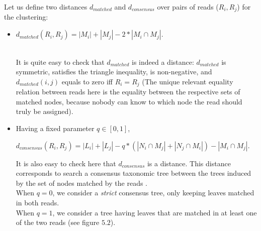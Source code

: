 \documentclass{report}
\begin{document}
Let us define two distances $d_{matched}$ and $d_{consensus}$ over pairs of reads ($R_{i},R_{j}$) for the clustering:
       \begin{itemize} 
       \item \begin{center} $d_{matched}(R_{i},R_{j}) = |M_{i}| + |M_{j}| - 2*|M_{i} \cap M_{j}|$. \end{center}\\ 

It is quite easy to check that $d_{matched}$ is indeed a distance: $d_{matched}$ is symmetric, satisfies the triangle inequality, is non-negative, and $d_{matched}(i,j)$ equals to zero iff $R_{i} = R_{j}$ (The unique relevant equality relation between reads here is the equality between the respective sets of matched nodes, because nobody can know to which node the read should truly be assigned).
       \item Having a fixed parameter $q \in [0,1]$,\\
\begin{center}
$d_{consensus}(R_{i},R_{j}) = |L_{i}| + |L_{j}| - q*(|N_{i}\cap M_{j}| + |N_{j} \cap M_{i}|) - |M_{i} \cap M_{j}|$.\\
\end{center}

It is also easy to check here that $d_{consensus}$ is a distance. This distance corresponds to search a consensus taxonomic tree between the trees induced by the set of nodes matched by the reads \cite{Consensus}.\\

When $q = 0$, we consider a \emph{strict} consensus tree, only keeping leaves matched in both reads.\\
When $q = 1$, we consider a tree having leaves that are matched in at least one of the two reads (see figure $5.2$).


\end{itemize}
\end{document}
